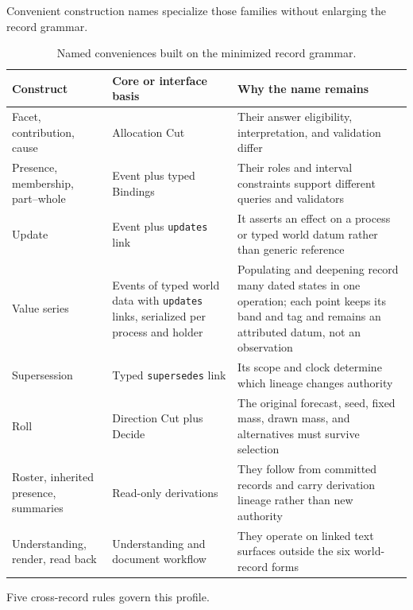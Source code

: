\documentclass[11pt,a4paper]{article}
\begin{document}
Convenient construction names specialize those families without enlarging the
record grammar.

\begin{table}[htbp]
\centering
\small
\begin{tabularx}{\textwidth}{@{}p{}p{}Y@{}}
\toprule
\textbf{Construct} & \textbf{Core or interface basis} & \textbf{Why the name remains} \\
\midrule
Facet, contribution, cause & Allocation Cut & Their answer eligibility, interpretation, and validation differ \\
Presence, membership, part--whole & Event plus typed Bindings & Their roles and interval constraints support different queries and validators \\
Update & Event plus \texttt{updates} link & It asserts an effect on a process or typed world datum rather than generic reference \\
Value series & Events of typed world data with \texttt{updates} links, serialized per process and holder & Populating and deepening record many dated states in one operation; each point keeps its band and tag and remains an attributed datum, not an observation \\
Supersession & Typed \texttt{supersedes} link & Its scope and clock determine which lineage changes authority \\
Roll & Direction Cut plus Decide & The original forecast, seed, fixed mass, drawn mass, and alternatives must survive selection \\
Roster, inherited presence, summaries & Read-only derivations & They follow from committed records and carry derivation lineage rather than new authority \\
Understanding, render, read back & Understanding and document workflow & They operate on linked text surfaces outside the six world-record forms \\
\bottomrule
\end{tabularx}
\caption{Named conveniences built on the minimized record grammar.}
\label{tab:construction-specializations}
\end{table}

Five cross-record rules govern this profile.
\end{document}
